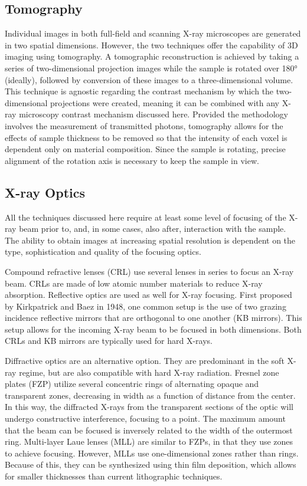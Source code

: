 \documentclass[journal=cmatex,manuscript=perspective]{achemso}
\begin{document}
\subsection{Tomography}

Individual images in both full-field and scanning X-ray microscopes
are generated in two spatial dimensions. However, the two techniques
offer the capability of 3D imaging using tomography. A tomographic
reconstruction is achieved by taking a series of two-dimensional
projection images while the sample is rotated over \ang{180}
(ideally), followed by conversion of these images to a
three-dimensional volume. This technique is agnostic regarding the
contrast mechanism by which the two-dimensional projections were
created, meaning it can be combined with any X-ray microscopy contrast
mechanism discussed here. Provided the methodology involves the
measurement of transmitted photons, tomography allows for the effects
of sample thickness to be removed so that the intensity of each voxel
is dependent only on material composition. Since the sample is
rotating, precise alignment of the rotation axis is necessary to keep
the sample in view.

\subsection{X-ray Optics}

All the techniques discussed here require at least some level of
focusing of the X-ray beam prior to, and, in some cases, also after,
interaction with the sample. The ability to obtain images at
increasing spatial resolution is dependent on the type, sophistication
and quality of the focusing optics.

Compound refractive lenses (CRL) use several lenses in series to focus
an X-ray beam. CRLs are made of low atomic number materials to reduce
X-ray absorption\cite{lengeler1996}. Reflective optics are used as
well for X-ray focusing. First proposed by Kirkpatrick and Baez in
1948, one common setup is the use of two grazing incidence reflective
mirrors that are orthogonal to one another (KB mirrors). This setup
allows for the incoming X-ray beam to be focused in both
dimensions. Both CRLs and KB mirrors are typically used for hard
X-rays\cite{kirkpatrick1948}.

Diffractive optics are an alternative option. They are predominant in
the soft X-ray regime, but are also compatible with hard X-ray
radiation. Fresnel zone plates (FZP) utilize several concentric rings
of alternating opaque and transparent zones, decreasing in width as a
function of distance from the center. In this way, the diffracted
X-rays from the transparent sections of the optic will undergo
constructive interference, focusing to a point. The maximum amount
that the beam can be focused is inversely related to the width of the
outermost ring.  Multi-layer Laue lenses (MLL) are similar to FZPs, in
that they use zones to achieve focusing. However, MLLs use
one-dimensional zones rather than rings. Because of this, they can be
synthesized using thin film deposition, which allows for smaller
thicknesses than current lithographic
techniques\cite{synchrotronradiation,lblzoneplate}.
\end{document}
